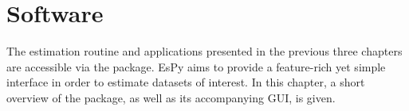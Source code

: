 \chapter{Software}
\label{chap:nmrespy}

The estimation routine and applications presented in the previous three
chapters are accessible via the  package. \ac{EsPy} aims to provide
a feature-rich yet simple interface in order to
estimate datasets of interest. In this chapter, a short
overview of the package, as well as its accompanying \ac{GUI}, is given.




